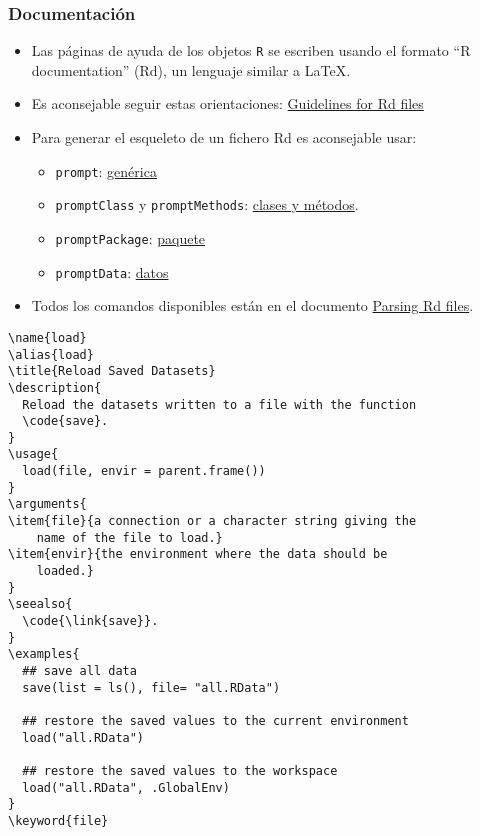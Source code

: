 \documentclass[xcolor={usenames,svgnames,dvipsnames}]{beamer}
\begin{document}
\begin{frame}
\frametitle{Documentación}
\label{sec-2-7}

\begin{itemize}
\item Las páginas de ayuda de los objetos \texttt{R} se escriben usando el
  formato “R documentation” (Rd), un lenguaje similar a \LaTeX{}.
\item Es aconsejable seguir estas orientaciones: \href{http://developer.r-project.org/Rds.html}{Guidelines for Rd files}
\item Para generar el esqueleto de un fichero Rd es aconsejable usar:
\begin{itemize}
\item \texttt{prompt}: \href{http://cran.r-project.org/doc/manuals/r-release/R-exts.html#Documenting-functions}{genérica}
\item \texttt{promptClass} y \texttt{promptMethods}: \href{http://cran.r-project.org/doc/manuals/r-release/R-exts.html#Documenting-S4-classes-and-methods}{clases y métodos}.
\item \texttt{promptPackage}: \href{http://cran.r-project.org/doc/manuals/r-release/R-exts.html#Documenting-packages}{paquete}
\item \texttt{promptData}: \href{http://cran.r-project.org/doc/manuals/r-release/R-exts.html#Documenting-data-sets}{datos}
\end{itemize}
\item Todos los comandos disponibles están en el documento \href{http://developer.r-project.org/parseRd.pdf}{Parsing Rd files}.
\end{itemize}
\end{frame}
\begin{frame}[fragile]


\begin{verbatim}
\name{load}
\alias{load}
\title{Reload Saved Datasets}
\description{
  Reload the datasets written to a file with the function
  \code{save}.
}
\usage{
  load(file, envir = parent.frame())
}
\arguments{
\item{file}{a connection or a character string giving the
    name of the file to load.}
\item{envir}{the environment where the data should be
    loaded.}
}
\seealso{
  \code{\link{save}}.
}
\examples{
  ## save all data
  save(list = ls(), file= "all.RData")
  
  ## restore the saved values to the current environment
  load("all.RData")
  
  ## restore the saved values to the workspace
  load("all.RData", .GlobalEnv)
}
\keyword{file}
\end{verbatim}
\end{frame}
\end{document}

